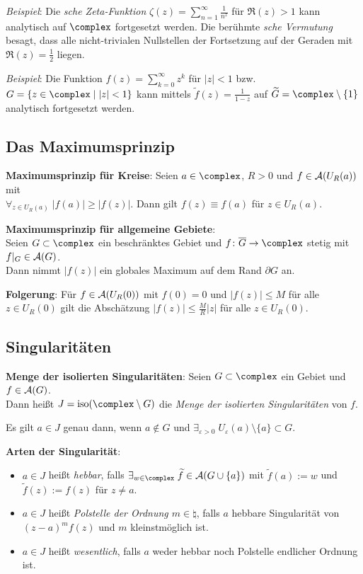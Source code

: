 \linie

\emph{Beispiel}:
Die \emph{sche Zeta-Funktion}
$\zeta(z) = \sum_{n=1}^\infty \frac{1}{n^z}$ für $\Re(z) > 1$ kann
analytisch auf $\complex$ fortgesetzt werden.
Die berühmte \emph{sche Vermutung} besagt, dass alle
nicht-trivialen Nullstellen
der Fortsetzung auf der Geraden mit $\Re(z) = \frac{1}{2}$ liegen.

\emph{Beispiel}:
Die Funktion $f(z) = \sum_{k=0}^\infty z^k$ für $|z| < 1$ bzw.
$G = \{z \in \complex \;|\; |z| < 1\}$ kann mittels
$\widetilde{f}(z) = \frac{1}{1 - z}$ auf
$\widetilde{G} = \complex \setminus \{1\}$ analytisch fortgesetzt werden.

\subsection{%
    Das Maximumsprinzip%
}

\textbf{Maximumsprinzip für Kreise}:
Seien $a \in \complex$, $R > 0$ und $f \in \mathcal{A}(U_R(a))$ mit\\
$\forall_{z \in U_R(a)}\; |f(a)| \ge |f(z)|$.
Dann gilt $f(z) \equiv f(a)$ für $z \in U_R(a)$.

\textbf{Maximumsprinzip für allgemeine Gebiete}:\\
Seien $G \subset \complex$ ein beschränktes Gebiet und
$f\colon \overline{G} \rightarrow \complex$ stetig mit $f|_G \in \mathcal{A}(G)$.\\
Dann nimmt $|f(z)|$ ein globales Maximum auf dem Rand $\partial G$ an.

\textbf{Folgerung}:
Für $f \in \mathcal{A}(U_R(0))$ mit $f(0) = 0$ und $|f(z)| \le M$ für alle
$z \in U_R(0)$ gilt die Abschätzung $|f(z)| \le \frac{M}{R} |z|$
für alle $z \in U_R(0)$.

\subsection{%
    Singularitäten%
}

\textbf{Menge der isolierten Singularitäten}:
Seien $G \subset \complex$ ein Gebiet und $f \in \mathcal{A}(G)$.\\
Dann heißt $J = \iso(\complex \setminus G)$ die
\emph{Menge der isolierten Singularitäten} von $f$.

Es gilt $a \in J$ genau dann, wenn
$a \notin G$ und
$\exists_{\varepsilon > 0}\; U_\varepsilon(a) \setminus \{a\} \subset G$.

\textbf{Arten der Singularität}:
\begin{itemize}
    \item
    $a \in J$ heißt \emph{hebbar}, falls
    $\exists_{w \in \complex}\; \widetilde{f} \in \A(G \cup \{a\})$ mit
    $\widetilde{f}(a) := w$ und $\widetilde{f}(z) := f(z)$ für $z \not= a$.

    \item
    $a \in J$ heißt \emph{Polstelle der Ordnung $m \in \natural$}, falls
    $a$ hebbare Singularität von $(z - a)^m f(z)$ und $m$ kleinstmöglich ist.

    \item
    $a \in J$ heißt \emph{wesentlich}, falls $a$ weder hebbar noch
    Polstelle endlicher Ordnung ist.
\end{itemize}

